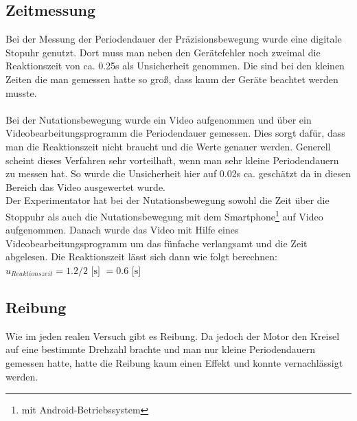 \documentclass[bibliography=totocnumbered]{scrartcl}
\begin{document}
	\subsection{Zeitmessung}
	Bei der Messung der Periodendauer der Präzisionsbewegung wurde eine digitale Stopuhr genutzt. Dort muss man neben den Gerätefehler noch zweimal die Reaktionszeit von ca. 0.25s als Unsicherheit genommen. Die sind bei den kleinen Zeiten die man gemessen hatte so groß, dass kaum der Geräte beachtet werden musste.\\
	\\
	Bei der Nutationsbewegung wurde ein Video aufgenommen und über ein Videobearbeitungsprogramm die Periodendauer gemessen. Dies sorgt dafür, dass man die Reaktionszeit nicht braucht und die Werte genauer werden. Generell scheint dieses Verfahren sehr vorteilhaft, wenn man sehr kleine Periodendauern zu messen hat.
	So wurde die Unsicherheit hier auf 0.02s ca. geschätzt da in diesen Bereich das Video ausgewertet wurde.\\
	Der Experimentator hat bei der Nutationsbewegung sowohl die Zeit über die Stoppuhr als auch die Nutationsbewegung mit dem Smartphone\footnote{mit Android-Betriebssystem} auf Video aufgenommen. Danach wurde das Video mit Hilfe eines Videobearbeitungsprogramm um das fünfache verlangsamt und die Zeit abgelesen. Die Reaktionszeit lässt sich dann wie folgt berechnen: $ u_{Reaktionszeit}=1.2/2 \text{ [s] }=0.6 \text{ [s] }$
	\subsection{Reibung}
	Wie im jeden realen Versuch gibt es Reibung.
	Da jedoch der Motor den Kreisel auf eine bestimmte Drehzahl brachte und man nur kleine Periodendauern gemessen hatte, hatte die Reibung kaum einen Effekt und konnte vernachlässigt werden.
	
	
	
\end{document}
